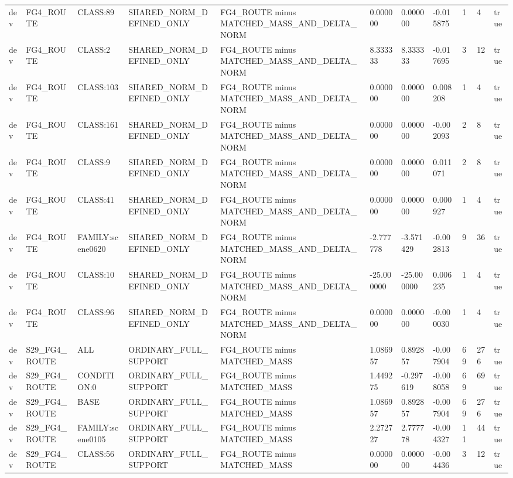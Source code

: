\begin{tabular}{lllllllllll}
dev & FG4\_ROUTE & CLASS:89 & SHARED\_NORM\_DEFINED\_ONLY & FG4\_ROUTE minus MATCHED\_MASS\_AND\_DELTA\_NORM & 0.000000 & 0.000000 & -0.015875 & 1 & 4 & true \\
dev & FG4\_ROUTE & CLASS:2 & SHARED\_NORM\_DEFINED\_ONLY & FG4\_ROUTE minus MATCHED\_MASS\_AND\_DELTA\_NORM & 8.333333 & 8.333333 & -0.017695 & 3 & 12 & true \\
dev & FG4\_ROUTE & CLASS:103 & SHARED\_NORM\_DEFINED\_ONLY & FG4\_ROUTE minus MATCHED\_MASS\_AND\_DELTA\_NORM & 0.000000 & 0.000000 & 0.008208 & 1 & 4 & true \\
dev & FG4\_ROUTE & CLASS:161 & SHARED\_NORM\_DEFINED\_ONLY & FG4\_ROUTE minus MATCHED\_MASS\_AND\_DELTA\_NORM & 0.000000 & 0.000000 & -0.002093 & 2 & 8 & true \\
dev & FG4\_ROUTE & CLASS:9 & SHARED\_NORM\_DEFINED\_ONLY & FG4\_ROUTE minus MATCHED\_MASS\_AND\_DELTA\_NORM & 0.000000 & 0.000000 & 0.011071 & 2 & 8 & true \\
dev & FG4\_ROUTE & CLASS:41 & SHARED\_NORM\_DEFINED\_ONLY & FG4\_ROUTE minus MATCHED\_MASS\_AND\_DELTA\_NORM & 0.000000 & 0.000000 & 0.000927 & 1 & 4 & true \\
dev & FG4\_ROUTE & FAMILY:scene0620 & SHARED\_NORM\_DEFINED\_ONLY & FG4\_ROUTE minus MATCHED\_MASS\_AND\_DELTA\_NORM & -2.777778 & -3.571429 & -0.002813 & 9 & 36 & true \\
dev & FG4\_ROUTE & CLASS:10 & SHARED\_NORM\_DEFINED\_ONLY & FG4\_ROUTE minus MATCHED\_MASS\_AND\_DELTA\_NORM & -25.000000 & -25.000000 & 0.006235 & 1 & 4 & true \\
dev & FG4\_ROUTE & CLASS:96 & SHARED\_NORM\_DEFINED\_ONLY & FG4\_ROUTE minus MATCHED\_MASS\_AND\_DELTA\_NORM & 0.000000 & 0.000000 & -0.000030 & 1 & 4 & true \\
dev & S29\_FG4\_ROUTE & ALL & ORDINARY\_FULL\_SUPPORT & FG4\_ROUTE minus MATCHED\_MASS & 1.086957 & 0.892857 & -0.007904 & 69 & 276 & true \\
dev & S29\_FG4\_ROUTE & CONDITION:0 & ORDINARY\_FULL\_SUPPORT & FG4\_ROUTE minus MATCHED\_MASS & 1.449275 & -0.297619 & -0.008058 & 69 & 69 & true \\
dev & S29\_FG4\_ROUTE & BASE & ORDINARY\_FULL\_SUPPORT & FG4\_ROUTE minus MATCHED\_MASS & 1.086957 & 0.892857 & -0.007904 & 69 & 276 & true \\
dev & S29\_FG4\_ROUTE & FAMILY:scene0105 & ORDINARY\_FULL\_SUPPORT & FG4\_ROUTE minus MATCHED\_MASS & 2.272727 & 2.777778 & -0.004327 & 11 & 44 & true \\
dev & S29\_FG4\_ROUTE & CLASS:56 & ORDINARY\_FULL\_SUPPORT & FG4\_ROUTE minus MATCHED\_MASS & 0.000000 & 0.000000 & -0.004436 & 3 & 12 & true \\

\end{tabular}
